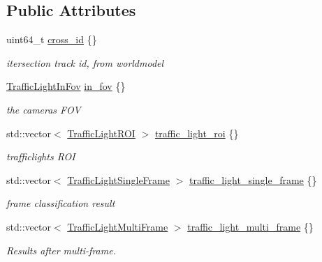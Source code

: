 \subsection*{Public Attributes}
\begin{DoxyCompactItemize}
\item 
uint64\+\_\+t \hyperlink{structmaf__perception__interface_1_1TrafficLightPerceptionResult_adc9a5bb3801a8821f2462717a9857fc3}{cross\+\_\+id} \{\}
\begin{DoxyCompactList}\small\item\em itersection track id, from worldmodel \end{DoxyCompactList}\item 
\hyperlink{structmaf__perception__interface_1_1TrafficLightInFov}{Traffic\+Light\+In\+Fov} \hyperlink{structmaf__perception__interface_1_1TrafficLightPerceptionResult_a38540b7913fb7ea4172933d1369ea81c}{in\+\_\+fov} \{\}
\begin{DoxyCompactList}\small\item\em the camera\textquotesingle{}s F\+OV \end{DoxyCompactList}\item 
std\+::vector$<$ \hyperlink{structmaf__perception__interface_1_1TrafficLightROI}{Traffic\+Light\+R\+OI} $>$ \hyperlink{structmaf__perception__interface_1_1TrafficLightPerceptionResult_af0d403865e9ddc1f893e8fae7cc897ca}{traffic\+\_\+light\+\_\+roi} \{\}
\begin{DoxyCompactList}\small\item\em trafficlights R\+OI \end{DoxyCompactList}\item 
std\+::vector$<$ \hyperlink{structmaf__perception__interface_1_1TrafficLightSingleFrame}{Traffic\+Light\+Single\+Frame} $>$ \hyperlink{structmaf__perception__interface_1_1TrafficLightPerceptionResult_a25c71b8bfbdd0ca918b736a2478c7703}{traffic\+\_\+light\+\_\+single\+\_\+frame} \{\}
\begin{DoxyCompactList}\small\item\em frame classification result \end{DoxyCompactList}\item 
std\+::vector$<$ \hyperlink{structmaf__perception__interface_1_1TrafficLightMultiFrame}{Traffic\+Light\+Multi\+Frame} $>$ \hyperlink{structmaf__perception__interface_1_1TrafficLightPerceptionResult_a98716c9e595edced01805976233c3158}{traffic\+\_\+light\+\_\+multi\+\_\+frame} \{\}
\begin{DoxyCompactList}\small\item\em Results after multi-\/frame. \end{DoxyCompactList}\item 

\end{DoxyCompactItemize}
